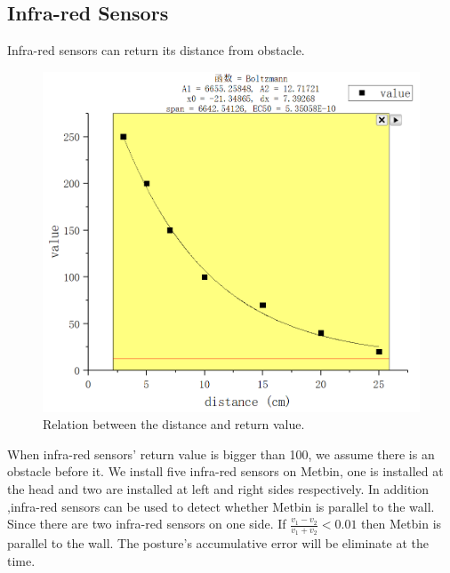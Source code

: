 \documentclass[12pt]{article}
\begin{document}
\subsection{Infra-red Sensors}
Infra-red sensors can return its distance from obstacle. 
\begin{figure}[H]
\centering
\includegraphics[scale=0.5]{P8.jpg}
\caption{Relation between the distance and return value. }
\end{figure}
When infra-red sensors' return value is bigger than 100, we assume there is an obstacle before it. We install five infra-red sensors on Metbin, one is installed at the head and two are installed at left and right sides respectively. In addition ,infra-red sensors can be used to detect whether Metbin is parallel to the wall. Since there are two infra-red sensors on one side. If $\frac{v_1-v_2}{v_1+v_2}<0.01$ then Metbin is parallel to the wall. The posture's accumulative error will be eliminate at the time.
\end{document}
